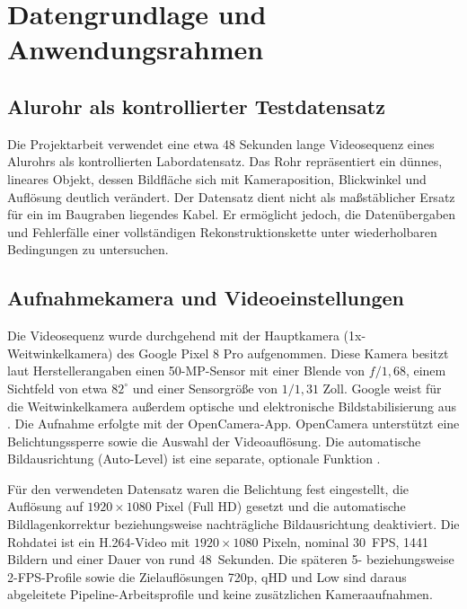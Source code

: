 \section{Datengrundlage und Anwendungsrahmen}
\label{sec:datengrundlage}

\subsection{Alurohr als kontrollierter Testdatensatz}

Die Projektarbeit verwendet eine etwa 48 Sekunden lange Videosequenz eines
Alurohrs als kontrollierten Labordatensatz. Das Rohr repräsentiert ein dünnes,
lineares Objekt, dessen Bildfläche sich mit Kameraposition, Blickwinkel und
Auflösung deutlich verändert. Der Datensatz dient nicht als maßstäblicher
Ersatz für ein im Baugraben liegendes Kabel. Er ermöglicht jedoch, die
Datenübergaben und Fehlerfälle einer vollständigen Rekonstruktionskette unter
wiederholbaren Bedingungen zu untersuchen.

\subsection{Aufnahmekamera und Videoeinstellungen}

Die Videosequenz wurde durchgehend mit der Hauptkamera (1x-Weitwinkelkamera)
des Google Pixel 8 Pro aufgenommen. Diese Kamera besitzt laut
Herstellerangaben einen 50-MP-Sensor mit einer Blende von $f/1{,}68$, einem
Sichtfeld von etwa $82^\circ$ und einer Sensorgröße von $1/1{,}31$ Zoll.
Google weist für die Weitwinkelkamera außerdem optische und elektronische
Bildstabilisierung aus \parencite{googlePixel8ProSpecs}. Die Aufnahme erfolgte
mit der OpenCamera-App. OpenCamera unterstützt eine Belichtungssperre sowie
die Auswahl der Videoauflösung. Die automatische Bildausrichtung (Auto-Level)
ist eine separate, optionale Funktion \parencite{openCameraHelp}.

Für den verwendeten Datensatz waren die Belichtung fest eingestellt, die
Auflösung auf $1920\times1080$ Pixel (Full HD) gesetzt und die automatische
Bildlagenkorrektur beziehungsweise nachträgliche Bildausrichtung deaktiviert.
Die Rohdatei  ist ein H.264-Video mit
$1920\times1080$ Pixeln, nominal 30~FPS, 1441 Bildern und einer Dauer von rund
48~Sekunden. Die späteren 5- beziehungsweise 2-FPS-Profile sowie die
Zielauflösungen 720p, qHD und Low sind daraus abgeleitete Pipeline-Arbeitsprofile
und keine zusätzlichen Kameraaufnahmen.

